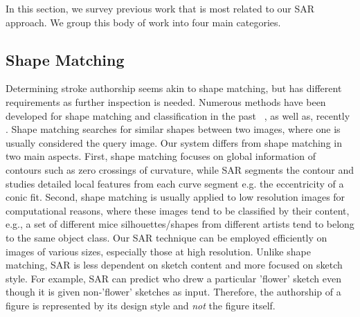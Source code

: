 In this section, we survey previous work that is most related to our SAR approach. We group this body of work into four main categories.

\vspace{-2mm}
\subsection{Shape Matching} \label{subsec: shapematching}
\vspace{-2mm}
Determining stroke authorship seems akin to shape matching, but has different requirements as further inspection is needed. Numerous methods have been developed for shape matching and classification in the past ~\cite{mokhtarian1992theory,belongie2001matching,jin2003image,berg2005shape}, as well as, recently \cite{Michel:2011:SID:1994006.1994152,ion-cviu-11}. Shape matching searches for similar shapes between two images, where one is usually considered the query image. Our system differs from shape matching in two main aspects. First, shape matching focuses on global information of contours such as zero crossings of curvature, while SAR segments the contour and studies detailed local features from each curve segment e.g. the eccentricity of a conic fit. Second, shape matching is usually applied to low resolution images for computational reasons, where these images tend to be classified by their content, e.g., a set of different mice silhouettes/shapes from different artists tend to belong to the same object class. Our SAR technique can be employed efficiently on images of various sizes, especially those at high resolution. Unlike shape matching, SAR is less dependent on sketch content and more focused on sketch style. For example, SAR can predict who drew a particular 'flower' sketch even though it is given non-'flower' sketches as input. Therefore, the authorship of a figure is represented by its design style and \emph{not} the figure itself.


\vspace{-2mm}
